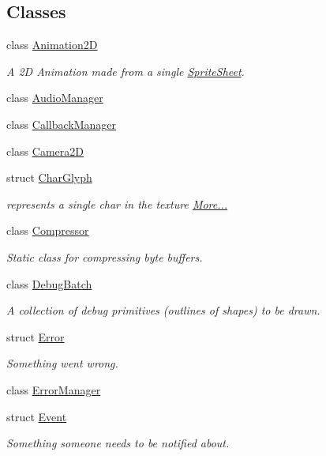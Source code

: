 \subsection*{Classes}
\begin{DoxyCompactItemize}
\item 
class \hyperlink{classnta_1_1Animation2D}{Animation2D}
\begin{DoxyCompactList}\small\item\em A 2D Animation made from a single \hyperlink{structnta_1_1SpriteSheet}{Sprite\+Sheet}. \end{DoxyCompactList}\item 
class \hyperlink{classnta_1_1AudioManager}{Audio\+Manager}
\item 
class \hyperlink{classnta_1_1CallbackManager}{Callback\+Manager}
\item 
class \hyperlink{classnta_1_1Camera2D}{Camera2D}
\item 
struct \hyperlink{namespacenta_d4/d26/structnta_1_1CharGlyph}{Char\+Glyph}
\begin{DoxyCompactList}\small\item\em represents a single char in the texture  \hyperlink{namespacenta_d4/d26/structnta_1_1CharGlyph}{More...}\end{DoxyCompactList}\item 
class \hyperlink{classnta_1_1Compressor}{Compressor}
\begin{DoxyCompactList}\small\item\em Static class for compressing byte buffers. \end{DoxyCompactList}\item 
class \hyperlink{classnta_1_1DebugBatch}{Debug\+Batch}
\begin{DoxyCompactList}\small\item\em A collection of debug primitives (outlines of shapes) to be drawn. \end{DoxyCompactList}\item 
struct \hyperlink{structnta_1_1Error}{Error}
\begin{DoxyCompactList}\small\item\em Something went wrong. \end{DoxyCompactList}\item 
class \hyperlink{classnta_1_1ErrorManager}{Error\+Manager}
\item 
struct \hyperlink{structnta_1_1Event}{Event}
\begin{DoxyCompactList}\small\item\em Something someone needs to be notified about. \end{DoxyCompactList}\item 

\end{DoxyCompactItemize}
